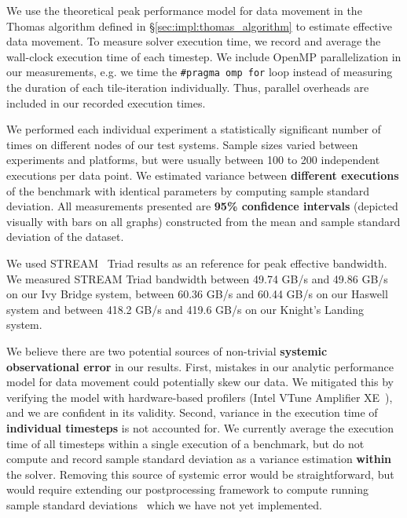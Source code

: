 \documentclass[10pt, conference, compsocconf]{IEEEtran}
\begin{document}
We use the theoretical peak performance model for data movement in the Thomas
  algorithm defined in \S\ref{sec:impl:thomas_algorithm} to estimate
  effective data movement.
To measure solver execution time, we record and average the wall-clock
  execution time of each timestep. 
We include OpenMP parallelization in our measurements, e.g. we time the
  \lstinline{#pragma omp for} loop instead of measuring the duration of each
  tile-iteration individually.
Thus, parallel overheads are included in our recorded execution times.

We performed each individual experiment a statistically significant number of 
  times on different nodes of our test systems.
Sample sizes varied between experiments and platforms, but were usually between
  100 to 200 independent executions per data point.
We estimated variance between \textbf{different
  executions} of the benchmark with identical parameters by computing sample
  standard deviation.
All measurements presented are \textbf{95\% confidence intervals} (depicted
  visually with bars on all graphs) constructed from the mean and sample standard
  deviation of the dataset.

We used STREAM~\cite{stream} Triad results as an reference for peak effective
  bandwidth.
We measured STREAM Triad bandwidth between 49.74 GB/s and 49.86 GB/s on our Ivy
  Bridge system, between 60.36 GB/s and 60.44 GB/s on our Haswell system and
  between 418.2 GB/s and 419.6 GB/s on our Knight's Landing system.

We believe there are two potential sources of non-trivial \textbf{systemic
  observational error} in our results.
First, mistakes in our analytic performance model for data movement could
  potentially skew our data.
We mitigated this by verifying the model with hardware-based
  profilers (Intel VTune Amplifier XE~\cite{intel_vtune_amplifier}), and we are
  confident in its validity.
Second, variance in the execution time of \textbf{individual timesteps} is not
  accounted for.
We currently average the execution time of all timesteps
  within a single execution of a benchmark, but do not compute and record
  sample standard deviation as a variance estimation \textbf{within} the solver.
Removing this source of systemic error would be straightforward, but
  would require extending our postprocessing framework to compute running 
  sample standard deviations~\cite{benchmarking_cxx_code} which we have not
  yet implemented.
\end{document}
